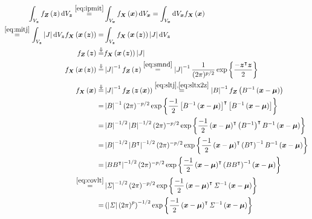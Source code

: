 \documentclass[
]{book}
\theoremstyle{definition}
\theoremstyle{definition}
\theoremstyle{definition}
\theoremstyle{definition}
\theoremstyle{remark}
\begin{document}
\[
\begin{aligned}
\int_{V_{\boldsymbol{z}}}f_{\boldsymbol{Z}}\left(\boldsymbol{z}\right)\mathrm{d}V_{\boldsymbol{z}}\overset{\ref{eq:ipmit}}{=} & \int_{V_{\boldsymbol{x}}}f_{\boldsymbol{X}}\left(\boldsymbol{x}\right)\mathrm{d}V_{\boldsymbol{x}}=\int_{V_{\boldsymbol{x}}}\mathrm{d}V_{\boldsymbol{x}}f_{\boldsymbol{X}}\left(\boldsymbol{x}\right)\\
\overset{\ref{eq:mitj}}{=}\int_{V_{\boldsymbol{z}}}\left|J\right|\mathrm{d}V_{\boldsymbol{z}}f_{\boldsymbol{X}}\left(\boldsymbol{x}\left(\boldsymbol{z}\right)\right)= & \int_{V_{\boldsymbol{z}}}f_{\boldsymbol{X}}\left(\boldsymbol{x}\left(\boldsymbol{z}\right)\right)\left|J\right|\mathrm{d}V_{\boldsymbol{z}}\\
f_{\boldsymbol{Z}}\left(\boldsymbol{z}\right)\overset{\Downarrow}{=} & f_{\boldsymbol{X}}\left(\boldsymbol{x}\left(\boldsymbol{z}\right)\right)\left|J\right|\\
f_{\boldsymbol{X}}\left(\boldsymbol{x}\left(\boldsymbol{z}\right)\right)\overset{\Downarrow}{=} & \left|J\right|^{-1}f_{\boldsymbol{Z}}\left(\boldsymbol{z}\right)\overset{\ref{eq:smnd}}{=}\left|J\right|^{-1}\frac{1}{(2\pi)^{p/2}}\exp\left\{ \frac{-\boldsymbol{z}^{\intercal}\boldsymbol{z}}{2}\right\} \\
f_{\boldsymbol{X}}\left(\boldsymbol{x}\right)\overset{\Downarrow}{=} & \left|J\right|^{-1}f_{\boldsymbol{Z}}\left(\boldsymbol{z}\left(\boldsymbol{x}\right)\right)\overset{\ref{eq:sltj},\ref{eq:sltx2z}}{=}\left|B\right|^{-1}f_{\boldsymbol{Z}}\left(B^{-1}\left(\boldsymbol{x}-\boldsymbol{\mu}\right)\right)\\
= & \left|B\right|^{-1}(2\pi)^{-p/2}\exp\left\{ \frac{-1}{2}\left[B^{-1}\left(\boldsymbol{x}-\boldsymbol{\mu}\right)\right]^{\intercal}\left[B^{-1}\left(\boldsymbol{x}-\boldsymbol{\mu}\right)\right]\right\} \\
= & \left|B\right|^{-1/2}\left|B\right|^{-1/2}(2\pi)^{-p/2}\exp\left\{ \frac{-1}{2}\left(\boldsymbol{x}-\boldsymbol{\mu}\right)^{\intercal}\left(B^{-1}\right)^{\intercal}B^{-1}\left(\boldsymbol{x}-\boldsymbol{\mu}\right)\right\} \\
= & \left|B\right|^{-1/2}\left|B^{\intercal}\right|^{-1/2}(2\pi)^{-p/2}\exp\left\{ \frac{-1}{2}\left(\boldsymbol{x}-\boldsymbol{\mu}\right)^{\intercal}\left(B^{\intercal}\right)^{-1}B^{-1}\left(\boldsymbol{x}-\boldsymbol{\mu}\right)\right\} \\
= & \left|BB^{\intercal}\right|^{-1/2}(2\pi)^{-p/2}\exp\left\{ \frac{-1}{2}\left(\boldsymbol{x}-\boldsymbol{\mu}\right)^{\intercal}\left(BB^{\intercal}\right)^{-1}\left(\boldsymbol{x}-\boldsymbol{\mu}\right)\right\} \\
\overset{\ref{eq:covlt}}{=} & \left|\mathit{\Sigma}\right|^{-1/2}(2\pi)^{-p/2}\exp\left\{ \frac{-1}{2}\left(\boldsymbol{x}-\boldsymbol{\mu}\right)^{\intercal}\mathit{\Sigma}^{-1}\left(\boldsymbol{x}-\boldsymbol{\mu}\right)\right\} \\
= & \left(\left|\mathit{\Sigma}\right|\left(2\pi\right)^{p}\right)^{-1/2}\exp\left\{ \frac{-1}{2}\left(\boldsymbol{x}-\boldsymbol{\mu}\right)^{\intercal}\mathit{\Sigma}^{-1}\left(\boldsymbol{x}-\boldsymbol{\mu}\right)\right\} 
\end{aligned}
\]
\end{document}
